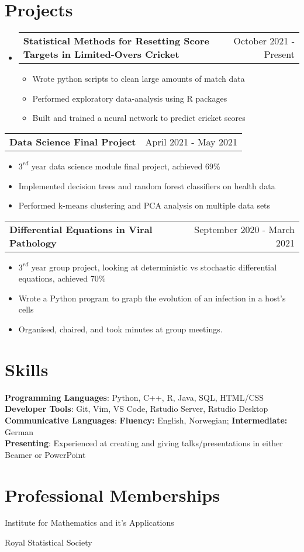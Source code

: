 \documentclass[letterpaper,11pt]{article}
\makeatletter
\newcommand{\resumeItem}[1]{
  \item\small{
    {#1 \vspace{-2pt}}
  }
}
\newcommand{\resumeProjectHeading}[2]{
    \item
    \begin{tabular*}{0.97\textwidth}{l@{\extracolsep{\fill}}r}
      \small#1 & #2 \\
    \end{tabular*}\vspace{-7pt}
}
\newcommand{\resumeSubHeadingListStart}{\begin{itemize}[leftmargin=0.15in, label={}]}
\newcommand{\resumeSubHeadingListEnd}{\end{itemize}}
\newcommand{\resumeItemListStart}{\begin{itemize}}
\newcommand{\resumeItemListEnd}{\end{itemize}\vspace{-5pt}}
\makeatother
\begin{document}
\section{Projects}
    \resumeSubHeadingListStart
    \resumeProjectHeading
          {\textbf{Statistical Methods for Resetting Score Targets in Limited-Overs Cricket}}{October 2021 - Present}
          \resumeItemListStart
            \resumeItem{Wrote python scripts to clean large amounts of match data}
            \resumeItem{Performed exploratory data-analysis using R packages}
            \resumeItem{Built and trained a neural network to predict cricket scores}
          \resumeItemListEnd
    \resumeSubHeadingListEnd 
      \resumeProjectHeading
          {\textbf{Data Science Final Project}}{April 2021 - May 2021}
          \resumeItemListStart
            \resumeItem{$3^{rd}$ year data science module final project, achieved 69\%}
            \resumeItem{Implemented decision trees and random forest classifiers on health data}
            \resumeItem{Performed k-means clustering and PCA analysis on multiple data sets}
          \resumeItemListEnd
      \resumeProjectHeading
          {\textbf{Differential Equations in Viral Pathology}}{September 2020 - March 2021}
          \resumeItemListStart
            \resumeItem{$3^{rd}$ year group project, looking at deterministic vs stochastic differential equations, achieved 70\%}
            \resumeItem{Wrote a Python program to graph the evolution of an infection in a host's cells}
            \resumeItem{Organised, chaired, and took minutes at group meetings.}
          \resumeItemListEnd

\section{Skills}
 \begin{itemize}[leftmargin=0.15in, label={}]
    \small{\item{
     \textbf{Programming Languages}{: Python, C++, R, Java, SQL, HTML/CSS} \\
     \textbf{Developer Tools}{: Git, Vim,  VS Code, Rstudio Server, Rstudio Desktop} \\
    \textbf{Communicative Languages}: \textbf{Fluency:} English, Norwegian; \textbf{Intermediate:} German \\
    \textbf{Presenting}{: Experienced at creating and giving talks/presentations in either Beamer or PowerPoint}
    }}
\end{itemize}

\section{Professional Memberships}
\begin{itemize}[leftmargin=0.15in, label={}]
    \small{\item{Institute for Mathematics and it's Applications} \\
           \item{Royal Statistical Society}}
\end{itemize}


\end{document}
